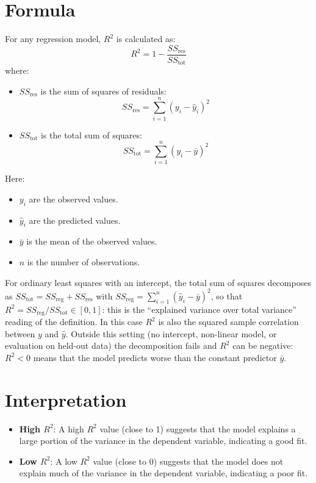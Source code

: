 \begin{notechapter}
\section{Formula}
For any regression model, \( R^2 \) is calculated as:
\[
R^2 = 1 - \frac{SS_{\text{res}}}{SS_{\text{tot}}}
\]
where:
\begin{itemize}
    \item \( SS_{\text{res}} \) is the sum of squares of residuals:
          \[
          SS_{\text{res}} = \sum_{i=1}^n (y_i - \hat{y}_i)^2
          \]
    \item \( SS_{\text{tot}} \) is the total sum of squares:
          \[
          SS_{\text{tot}} = \sum_{i=1}^n (y_i - \bar{y})^2
          \]
\end{itemize}
Here:
\begin{itemize}
    \item \( y_i \) are the observed values.
    \item \( \hat{y}_i \) are the predicted values.
    \item \( \bar{y} \) is the mean of the observed values.
        \item \( n \) is the number of observations.
\end{itemize}
For ordinary least squares with an intercept, the total sum of squares
decomposes as \( SS_{\text{tot}} = SS_{\text{reg}} + SS_{\text{res}} \) with
\( SS_{\text{reg}} = \sum_{i=1}^n (\hat{y}_i - \bar{y})^2 \), so that
\( R^2 = SS_{\text{reg}}/SS_{\text{tot}} \in [0,1] \): this is the ``explained
variance over total variance'' reading of the definition. In this case
\( R^2 \) is also the squared sample correlation between \( y \) and
\( \hat{y} \). Outside this setting (no intercept, non-linear model, or
evaluation on held-out data) the decomposition fails and \( R^2 \) can be
negative: \( R^2 < 0 \) means that the model predicts worse than the
constant predictor \( \bar{y} \).

\section{Interpretation}
\begin{itemize}
    \item \textbf{High \( R^2 \)}: A high \( R^2 \) value (close to 1) 
          suggests that the model explains a large portion of the 
          variance in the dependent variable, indicating a good fit.
    \item \textbf{Low \( R^2 \)}: A low \( R^2 \) value (close to 0) 
          suggests that the model does not explain much of the variance 
          in the dependent variable, indicating a poor fit.
\end{itemize}


\end{notechapter}
